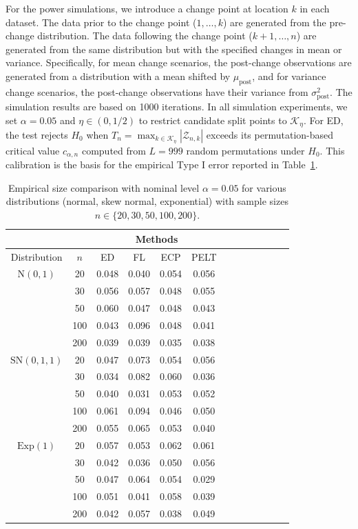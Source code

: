 \documentclass[11pt]{article}
\numberwithin{theorem}{section}
\numberwithin{Lemma}{section}
\numberwithin{Definition}{section}
\begin{document}
For the power simulations, we introduce a change point at location $ k $ in each dataset. The data prior to the change point ($ 1,\ldots,k $) are generated from the pre-change distribution. The data following the change point ($ k+1,\ldots,n $) are generated from the same distribution but with the specified changes in mean or variance. Specifically, for mean change scenarios, the post-change observations are generated from a distribution with a mean shifted by $ \mu_{\text{post}} $, and for variance change scenarios, the post-change observations have their variance from $ \sigma^2_{\text{post}} $. The simulation results are based on 1000 iterations. In all simulation experiments, we set $\alpha=0.05$ and $\eta \in (0,1/2)$ to restrict candidate split points to $\mathcal{K}_\eta$. For ED, the test rejects $H_0$ when $T_n=\max_{k\in \mathcal{K}_\eta}|\mathcal{Z}_{n,k}|$ exceeds its permutation-based critical value $c_{\alpha,n}$ computed from $L=999$ random permutations under $H_0$. This calibration is the basis for the empirical Type I error reported in Table~\ref{ty1}.\\



{\setlength{\tabcolsep}{1em}
\begin{table}[H]
\footnotesize
\caption{Empirical size comparison with nominal level $\alpha = 0.05$ for various distributions (normal, skew normal, exponential) with sample sizes $n \in \{20, 30, 50, 100, 200\}$.}
\centering
\begin{tabular}{ccccccccccccc}
\hline
 & & \multicolumn{4}{c}{Methods} \\ \hline
Distribution & \multirow{1}{*}{$n$} & ED & FL & ECP & PELT \\ \hline
$\text{N}(0,1)$ 
 & 20  & 0.048 & 0.040 & 0.054 & 0.056 \\
 & 30  & 0.056 & 0.057 & 0.048 & 0.055 \\
 & 50  & 0.060 & 0.047 & 0.048 & 0.043 \\
 & 100 & 0.043 & 0.096 & 0.048 & 0.041 \\
 & 200 & 0.039 & 0.039 & 0.035 & 0.038 \\ \hline
$\text{SN}(0,1,1)$ 
& 20  & 0.047 & 0.073 & 0.054 & 0.056 \\
 & 30  & 0.034 & 0.082 & 0.060 & 0.036 \\
 & 50  & 0.040 & 0.031 & 0.053 & 0.052 \\
 & 100 & 0.061 & 0.094 & 0.046 & 0.050 \\
 & 200 & 0.055 & 0.065 & 0.053 & 0.040 \\\hline
$\text{Exp}(1)$ 
 & 20  & 0.057 & 0.053 & 0.062 & 0.061 \\
 & 30  & 0.042 & 0.036 & 0.050 & 0.056 \\
 & 50  & 0.047 & 0.064 & 0.054 & 0.029 \\
 & 100 & 0.051 & 0.041 & 0.058 & 0.039 \\
 & 200 & 0.042 & 0.057 & 0.038 & 0.049 \\ \hline
\end{tabular}
\label{ty1}
\end{table}}
\end{document}
